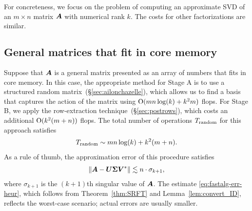 \documentclass[final]{siamltex}
\newcounter{algorithm}[section]
\newcommand{\pgnotate}[1]{{\color{blue}[#1]}}
\begin{document}
For concreteness, we focus on the problem of computing an approximate
SVD of an $m \times n$ matrix $\bm{A}$ with numerical rank $k$.
The costs for other factorizations are similar.


\subsection{General matrices that fit in core memory}
\label{sec:generalmat}

Suppose that $\bm{A}$ is a general matrix presented as an array
of numbers that fits in core memory.  In this case, the appropriate
method for Stage A is to use a structured random matrix~(\S\ref{sec:ailonchazelle}),
which allows us to find a basis that captures the action of the matrix
using $\mathrm{O}(mn\log(k) + k^2 m)$ flops.  For Stage B, we apply
the row-extraction technique~(\S\ref{sec:postrows}), which costs
an additional $\mathrm{O}(k^2(m+n))$ flops.  The total number of operations
$T_{\rm random}$ for this approach satisfies
$$
T_{\rm random} \sim mn \log(k) + k^2 (m+n).
$$
As a rule of thumb, the approximation error of this procedure satisfies
\begin{equation} \label{eq:fastalg-err-heur}
\norm{ \mtx{A} - \mtx{U\Sigma V}^\adj }
    \lesssim n \cdot \sigma_{k+1},
\end{equation}
where $\sigma_{k+1}$ is the $(k+1)$th singular value of $\bm{A}$.
%
%
The estimate \eqref{eq:fastalg-err-heur}, which follows from Theorem~\ref{thm:SRFT}
and Lemma~\ref{lem:convert_ID}, reflects the worst-case scenario;
actual errors are usually smaller.
\end{document}
